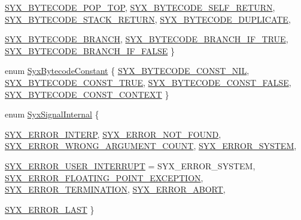 \begin{CompactItemize}
\hyperlink{syx-enums_8h_c28bf33befde579fdfc5b282947c25a023b7226e43e34c7f769e204a8dae32f1}{SYX\_\-BYTECODE\_\-POP\_\-TOP}, 
\hyperlink{syx-enums_8h_c28bf33befde579fdfc5b282947c25a0c9bf157dafea879931bf6a77a5373a7b}{SYX\_\-BYTECODE\_\-SELF\_\-RETURN}, 
\hyperlink{syx-enums_8h_c28bf33befde579fdfc5b282947c25a0ea06c76d0ce11dc7d538110dc01ce6b0}{SYX\_\-BYTECODE\_\-STACK\_\-RETURN}, 
\hyperlink{syx-enums_8h_c28bf33befde579fdfc5b282947c25a0b6373a51003fdf604f64ae9558a5f206}{SYX\_\-BYTECODE\_\-DUPLICATE}, 
\par
\hyperlink{syx-enums_8h_c28bf33befde579fdfc5b282947c25a07d08b2db595f79461a7b6ec9f751dcaf}{SYX\_\-BYTECODE\_\-BRANCH}, 
\hyperlink{syx-enums_8h_c28bf33befde579fdfc5b282947c25a0b29849423875a174db5ad5704e25bbba}{SYX\_\-BYTECODE\_\-BRANCH\_\-IF\_\-TRUE}, 
\hyperlink{syx-enums_8h_c28bf33befde579fdfc5b282947c25a0f8346aa291a41ebc596a336096a39fcd}{SYX\_\-BYTECODE\_\-BRANCH\_\-IF\_\-FALSE}
 \}
\item 
enum \hyperlink{syx-enums_8h_bfdf45841eaefa280895bce3ccb9d273}{SyxBytecodeConstant} \{ \hyperlink{syx-enums_8h_bfdf45841eaefa280895bce3ccb9d273deaa1a5b820f053cbd87570e818ca60e}{SYX\_\-BYTECODE\_\-CONST\_\-NIL}, 
\hyperlink{syx-enums_8h_bfdf45841eaefa280895bce3ccb9d27392a0faee7fa036528e12d54e0bcd7b98}{SYX\_\-BYTECODE\_\-CONST\_\-TRUE}, 
\hyperlink{syx-enums_8h_bfdf45841eaefa280895bce3ccb9d27372973e7bda488daf8b8dfdee4744922f}{SYX\_\-BYTECODE\_\-CONST\_\-FALSE}, 
\hyperlink{syx-enums_8h_bfdf45841eaefa280895bce3ccb9d27313053189291d24f0d97496d571e58d1e}{SYX\_\-BYTECODE\_\-CONST\_\-CONTEXT}
 \}
\item 
enum \hyperlink{syx-enums_8h_4b3bc4c6edc3fea1ee42d40b28384101}{SyxSignalInternal} \{ \par
\hyperlink{syx-enums_8h_4b3bc4c6edc3fea1ee42d40b28384101569a8cbd1f0f3c1108becc4c35b55603}{SYX\_\-ERROR\_\-INTERP}, 
\hyperlink{syx-enums_8h_4b3bc4c6edc3fea1ee42d40b283841012288f5a3defa608bdbbdd9bb816196bb}{SYX\_\-ERROR\_\-NOT\_\-FOUND}, 
\hyperlink{syx-enums_8h_4b3bc4c6edc3fea1ee42d40b2838410102d94312a5a548b731a59a332495c728}{SYX\_\-ERROR\_\-WRONG\_\-ARGUMENT\_\-COUNT}, 
\hyperlink{syx-enums_8h_4b3bc4c6edc3fea1ee42d40b28384101bb04035f4d1d813388f1e26c6d639086}{SYX\_\-ERROR\_\-SYSTEM}, 
\par
\hyperlink{syx-enums_8h_4b3bc4c6edc3fea1ee42d40b283841014e558327734bae191550b44bb1c62338}{SYX\_\-ERROR\_\-USER\_\-INTERRUPT} =  SYX\_\-ERROR\_\-SYSTEM, 
\hyperlink{syx-enums_8h_4b3bc4c6edc3fea1ee42d40b28384101ed95429e823c504267bd2c0fa56899c7}{SYX\_\-ERROR\_\-FLOATING\_\-POINT\_\-EXCEPTION}, 
\hyperlink{syx-enums_8h_4b3bc4c6edc3fea1ee42d40b283841012579267cfe87999a3e2539601b794652}{SYX\_\-ERROR\_\-TERMINATION}, 
\hyperlink{syx-enums_8h_4b3bc4c6edc3fea1ee42d40b28384101942cafd0c22ae31f512490786fde6569}{SYX\_\-ERROR\_\-ABORT}, 
\par
\hyperlink{syx-enums_8h_4b3bc4c6edc3fea1ee42d40b2838410145a45762cd749d3e11f4f7bd485e2336}{SYX\_\-ERROR\_\-LAST}
 \}
\end{CompactItemize}


